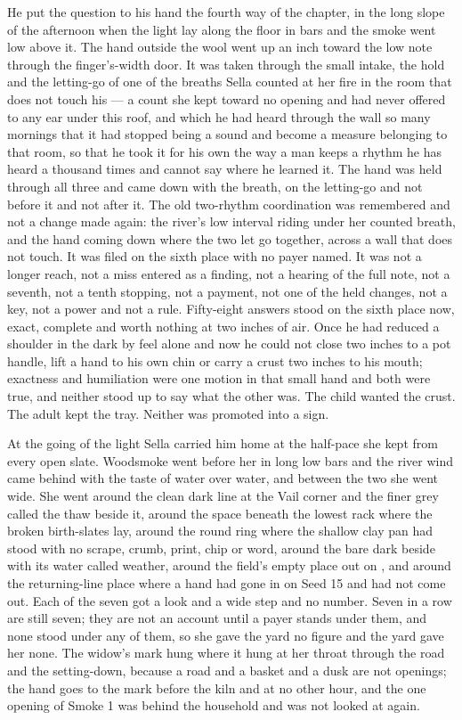 He put the question to his hand the fourth way of the chapter, in the long slope of the afternoon when the light lay along the floor in bars and the smoke went low above it. The hand outside the wool went up an inch toward the low note through the finger's-width door. It was taken through the small intake, the hold and the letting-go of one of the breaths Sella counted at her fire in the room that does not touch his --- a count she kept toward no opening and had never offered to any ear under this roof, and which he had heard through the wall so many mornings that it had stopped being a sound and become a measure belonging to that room, so that he took it for his own the way a man keeps a rhythm he has heard a thousand times and cannot say where he learned it. The hand was held through all three and came down with the breath, on the letting-go and not before it and not after it. The old two-rhythm coordination was remembered and not a change made again: the river's low interval riding under her counted breath, and the hand coming down where the two let go together, across a wall that does not touch. It was filed on the sixth place with no payer named. It was not a longer reach, not a miss entered as a finding, not a hearing of the full note, not a seventh, not a tenth stopping, not a payment, not one of the held changes, not a key, not a power and not a rule. Fifty-eight answers stood on the sixth place now, exact, complete and worth nothing at two inches of air. Once he had reduced a shoulder in the dark by feel alone and now he could not close two inches to a pot handle, lift a hand to his own chin or carry a crust two inches to his mouth; exactness and humiliation were one motion in that small hand and both were true, and neither stood up to say what the other was. The child wanted the crust. The adult kept the tray. Neither was promoted into a sign.

At the going of the light Sella carried him home at the half-pace she kept from every open slate. Woodsmoke went before her in long low bars and the river wind came behind with the taste of water over water, and between the two she went wide. She went around the clean dark line at the Vail corner and the finer grey called the thaw beside it, around the space beneath the lowest rack where the broken birth-slates lay, around the round ring where the shallow clay pan had stood with no scrape, crumb, print, chip or word, around the bare dark  beside  with its water called weather, around the field's empty place out on , and around the returning-line place where a hand had gone in on Seed 15 and had not come out. Each of the seven got a look and a wide step and no number. Seven in a row are still seven; they are not an account until a payer stands under them, and none stood under any of them, so she gave the yard no figure and the yard gave her none. The widow's mark hung where it hung at her throat through the road and the setting-down, because a road and a basket and a dusk are not openings; the hand goes to the mark before the kiln and at no other hour, and the one opening of Smoke 1 was behind the household and was not looked at again.

